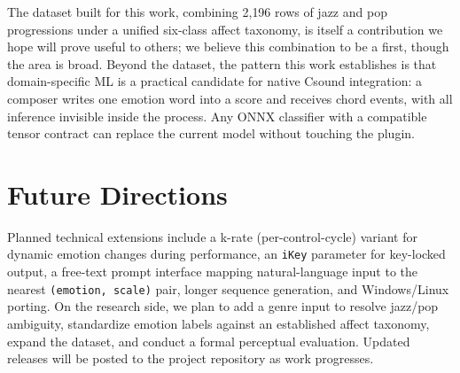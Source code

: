 \documentclass[runningheads,a4paper]{llncs}
\begin{document}
The dataset built for this work, combining 2{,}196 rows of jazz and pop
progressions under a unified six-class affect taxonomy, is itself a contribution
we hope will prove useful to others; we believe this combination to be a first,
though the area is broad. Beyond the dataset, the pattern this work establishes
is that domain-specific ML is a practical candidate for native Csound integration:
a composer writes one emotion word into a score and receives chord events, with
all inference invisible inside the process. Any ONNX classifier with a compatible
tensor contract can replace the current model without touching the plugin.


\section{Future Directions}
\label{sec:future}

Planned technical extensions include a k-rate (per-control-cycle) variant
for dynamic emotion changes during performance, an \texttt{iKey} parameter
for key-locked output, a free-text prompt interface mapping natural-language
input to the nearest \texttt{(emotion, scale)} pair, longer sequence
generation, and Windows/Linux porting. On the research side, we plan to add
a genre input to resolve jazz/pop ambiguity, standardize emotion labels
against an established affect taxonomy, expand the dataset, and conduct a
formal perceptual evaluation. Updated releases will be posted to the project
repository as work progresses.
\end{document}
